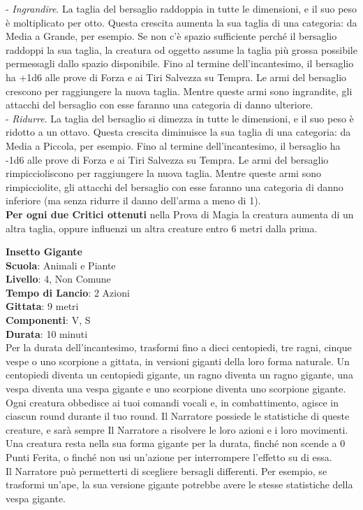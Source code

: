 \begin{multicols}{2}
- \textit{Ingrandire}. La taglia del bersaglio raddoppia in tutte le dimensioni, e il suo peso è moltiplicato per otto. Questa crescita aumenta la sua taglia di una categoria: da Media a Grande, per esempio. Se non c'è spazio sufficiente perché il bersaglio raddoppi la sua taglia, la creatura od oggetto assume la taglia più grossa possibile permessagli dallo spazio disponibile. Fino al termine dell'incantesimo, il bersaglio ha +1d6 alle prove di Forza e ai Tiri Salvezza su Tempra. Le armi del bersaglio crescono per raggiungere la nuova taglia. Mentre queste armi sono ingrandite, gli attacchi del bersaglio con esse faranno una categoria di danno ulteriore.\\
- \textit{Ridurre}. La taglia del bersaglio si dimezza in tutte le dimensioni, e il suo peso è ridotto a un ottavo. Questa crescita diminuisce la sua taglia di una categoria: da Media a Piccola, per esempio. Fino al termine dell'incantesimo, il bersaglio ha -1d6 alle prove di Forza e ai Tiri Salvezza su Tempra. Le armi del bersaglio rimpiccioliscono per raggiungere la nuova taglia. Mentre queste armi sono rimpicciolite, gli attacchi del bersaglio con esse faranno una categoria di danno inferiore (ma senza ridurre il danno dell'arma a meno di 1).\\
\textbf{Per ogni due Critici ottenuti} nella Prova di Magia la creatura aumenta di un altra taglia, oppure influenzi un altra creature entro 6 metri dalla prima.

\medskip\textbf{Insetto Gigante}\\
\textbf{Scuola}: Animali e Piante\\
\textbf{Livello}: 4, Non Comune\\
\textbf{Tempo di Lancio}: 2 Azioni\\
\textbf{Gittata}: 9 metri\\
\textbf{Componenti}: V, S\\
\textbf{Durata}: 10 minuti\\
Per la durata dell'incantesimo, trasformi fino a dieci centopiedi, tre ragni, cinque vespe o uno scorpione a gittata, in versioni giganti della loro forma naturale. Un centopiedi diventa un centopiedi gigante, un ragno diventa un ragno gigante, una vespa diventa una vespa gigante e uno scorpione diventa uno scorpione gigante. Ogni creatura obbedisce ai tuoi comandi vocali e, in combattimento, agisce in ciascun round durante il tuo round. Il Narratore possiede le statistiche di queste creature, e sarà sempre Il Narratore a risolvere le loro azioni e i loro movimenti. Una creatura resta nella sua forma gigante per la durata, finché non scende a 0 Punti Ferita, o finché non usi un'azione per interrompere l'effetto su di essa.\\
Il Narratore può permetterti di scegliere bersagli differenti. Per esempio, se trasformi un'ape, la sua versione gigante potrebbe avere le stesse statistiche della vespa gigante.


\end{multicols}
